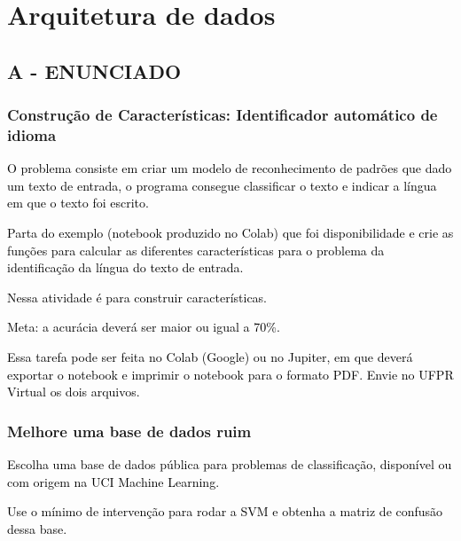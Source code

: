 \label{ap:ap06}
\chapter{Arquitetura de dados}
\section*{\textbf{A - ENUNCIADO}}


\subsection{Construção de Características: Identificador automático de idioma}

\textcolor{black}{O problema consiste em criar um modelo de reconhecimento de padrões que dado um texto de entrada, o
programa consegue classificar o texto e indicar a língua em que o texto foi escrito.}



\textcolor{black}{Parta do exemplo (notebook produzido no Colab) que foi disponibilidade e crie as funções para calcular
as diferentes características para o problema da identificação da língua do texto de entrada.}



\textcolor{black}{Nessa atividade é para {\textquotedbl}construir características{\textquotedbl}.}



\textcolor{black}{Meta: a acurácia deverá ser maior ou igual a 70\%.}



\textcolor{black}{Essa tarefa pode ser feita no Colab (Google) ou no Jupiter, em que deverá exportar o notebook e
imprimir o notebook para o formato PDF. Envie no UFPR Virtual os dois arquivos.}



\subsection{Melhore uma base de dados ruim}



\textcolor{black}{Escolha uma base de dados pública para problemas de classificação, disponível ou com origem na UCI
Machine Learning.}



\textcolor{black}{Use o mínimo de intervenção para rodar a SVM e obtenha a matriz de confusão dessa base.}



